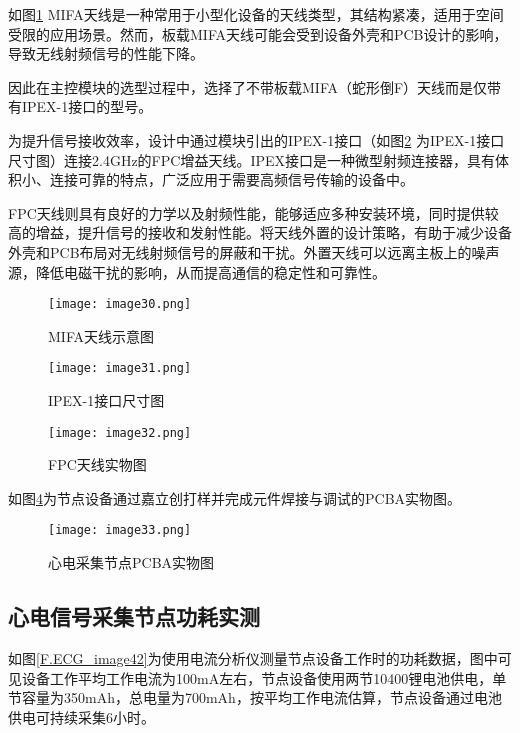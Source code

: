 如图\ref{F.ECG_image30} MIFA天线是一种常用于小型化设备的天线类型，其结构紧凑，适用于空间受限的应用场景。然而，板载MIFA天线可能会受到设备外壳和PCB设计的影响，导致无线射频信号的性能下降。

因此在主控模块的选型过程中，选择了不带板载MIFA（蛇形倒F）天线而是仅带有IPEX-1接口的型号。

为提升信号接收效率，设计中通过模块引出的IPEX-1接口（如图\ref{F.ECG_image31} 为IPEX-1接口尺寸图）连接2.4GHz的FPC增益天线。IPEX接口是一种微型射频连接器，具有体积小、连接可靠的特点，广泛应用于需要高频信号传输的设备中。

FPC天线则具有良好的力学以及射频性能，能够适应多种安装环境，同时提供较高的增益，提升信号的接收和发射性能。将天线外置的设计策略，有助于减少设备外壳和PCB布局对无线射频信号的屏蔽和干扰。外置天线可以远离主板上的噪声源，降低电磁干扰的影响，从而提高通信的稳定性和可靠性。

\begin{figure}[htb]
    \centering
    \texttt{[image: image30.png]}
    \caption{MIFA天线示意图}
    \label{F.ECG_image30}
\end{figure}

\begin{figure}[htb]
    \centering
    \texttt{[image: image31.png]}
    \caption{IPEX-1接口尺寸图\cite{IPEX-1}}
    \label{F.ECG_image31}
\end{figure}

\begin{figure}[H]
    \centering
    \texttt{[image: image32.png]}
    \caption{FPC天线实物图}
    \label{F.ECG_image32}
\end{figure}

如图\ref{F.ECG_image33}为节点设备通过嘉立创打样并完成元件焊接与调试的PCBA实物图。

\begin{figure}[htb]
    \centering
    \texttt{[image: image33.png]}
    \caption{心电采集节点PCBA实物图}
    \label{F.ECG_image33}
\end{figure}

\subsection{心电信号采集节点功耗实测}

如图\ref{F.ECG_image42}为使用电流分析仪测量节点设备工作时的功耗数据，图中可见设备工作平均工作电流为100mA左右，节点设备使用两节10400锂电池供电，单节容量为350mAh，总电量为700mAh，按平均工作电流估算，节点设备通过电池供电可持续采集6小时。

